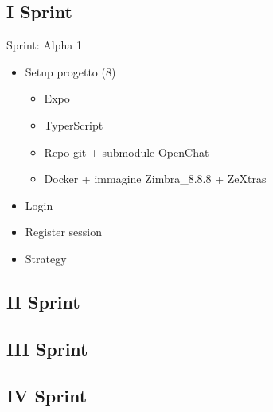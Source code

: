 \subsection{I Sprint}
Sprint: Alpha 1
\begin{itemize}
	\item Setup progetto (8)
	\begin{itemize}
		\item Expo
		\item TyperScript	
		\item Repo git + submodule OpenChat
		\item Docker + immagine Zimbra\_8.8.8 + ZeXtras
	\end{itemize}
	\item Login
	\item Register session
	\item Strategy
\end{itemize}

\subsection{II Sprint}
\subsection{III Sprint}
\subsection{IV Sprint}

